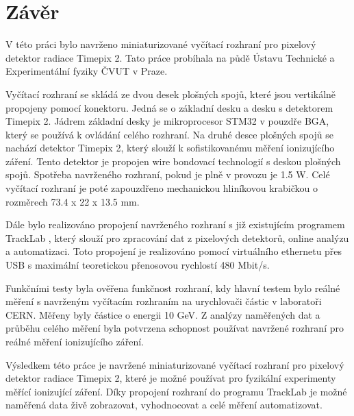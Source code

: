 \chapter{Závěr}

V této práci bylo navrženo miniaturizované vyčítací rozhraní pro pixelový detektor radiace Timepix 2. Tato práce probíhala na půdě Ústavu Technické a Experimentální fyziky ČVUT v Praze. 

Vyčítací rozhraní se skládá ze dvou desek plošných spojů, které jsou vertikálně propojeny pomocí konektoru. Jedná se o základní desku a desku s detektorem Timepix 2. Jádrem základní desky je mikroprocesor STM32 v pouzdře BGA, který se používá k ovládání celého rozhraní. Na druhé desce plošných spojů se nachází detektor Timepix 2, který slouží k sofistikovanému měření ionizujícího záření. Tento detektor je propojen wire bondovací technologií s deskou plošných spojů. Spotřeba navrženého rozhraní, pokud je plně v provozu je 1.5 W. Celé vyčítací rozhraní je poté zapouzdřeno mechanickou hliníkovou krabičkou o rozměrech 73.4 x 22 x 13.5 mm.

Dále bylo realizováno propojení navrženého rozhraní s již existujícím programem TrackLab \cite{Manek_2024}, který slouží pro zpracování dat z pixelových detektorů, online analýzu a automatizaci. Toto propojení je realizováno pomocí virtuálního ethernetu přes USB s maximální teoretickou přenosovou rychlostí 480 Mbit/s.
 
Funkčními testy byla ověřena funkčnost rozhraní, kdy hlavní testem bylo reálné měření s navrženým vyčítacím rozhraním na urychlovači částic v laboratoři CERN. Měřeny byly částice o energii 10 GeV. Z analýzy naměřených dat a průběhu celého měření byla potvrzena schopnost používat navržené rozhraní pro reálné měření ionizujícího záření. 
\newline
\par
Výsledkem této práce je navržené miniaturizované vyčítací rozhraní pro pixelový detektor radiace Timepix 2, které je možné používat pro fyzikální experimenty měřící ionizující záření. Díky propojení rozhraní do programu TrackLab je možné naměřená data živě zobrazovat, vyhodnocovat a celé měření automatizovat. 

